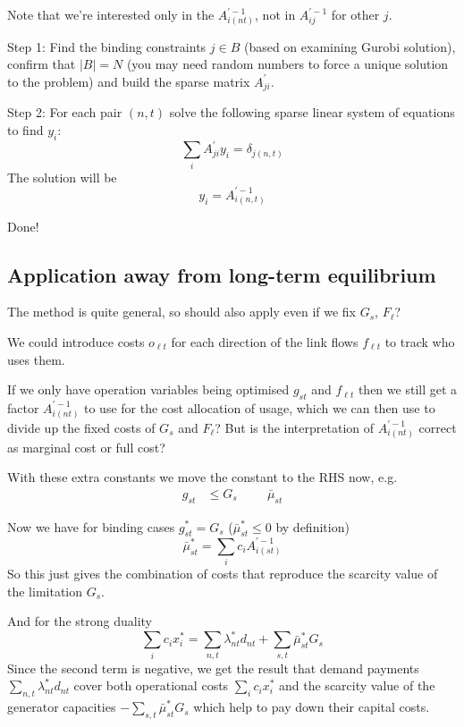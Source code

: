 \documentclass[final,3p,times]{elsarticle}
\begin{document}
Note that we're interested only in the $A^{\prime -1}_{i(nt)}$, not in $A^{\prime -1}_{ij}$ for other $j$.

Step 1: Find the binding constraints $j\in B$ (based on examining Gurobi solution), confirm that $|B| = N$ (you may need random numbers to force a unique solution to the problem) and build the sparse matrix $A^{\prime}_{ji}$.

Step 2: For each pair $(n,t)$ solve the following sparse linear system of equations to find $y_i$:
\begin{equation}
  \sum_i A^{\prime}_{ji} y_i = \delta_{j(n,t)}
\end{equation}
The solution will be
\begin{equation}
  y_i =  A^{\prime -1}_{i(n,t)}
\end{equation}

Done!

\subsection{Application away from long-term equilibrium}

The method is quite general, so should also apply even if we fix $G_s$, $F_\ell$?

We could introduce costs $o_{\ell t}$ for each direction of the link flows $f_{\ell t}$ to track who uses them.

If we only have operation variables being optimised $g_{st}$ and $f_{\ell t}$ then we still get a factor $A^{\prime -1}_{i(nt)}$ to use for the cost allocation of usage, which we can then use to divide up the fixed costs of $G_s$ and $F_\ell$? But is the interpretation of $A^{\prime -1}_{i(nt)}$ correct as marginal cost or full cost?

With these extra constants we move the constant to the RHS now, e.g.
\begin{align}
  g_{st}  & \leq G_s  \hspace{1cm} \bar{\mu}_{st}
\end{align}

Now we have for binding cases $g_{st}^* = G_s$ ($\bar{\mu}_{st}^* \leq 0$ by definition)
\begin{equation}
  \bar{\mu}_{st}^* = \sum_i c_i  A^{\prime -1}_{i(st)}
\end{equation}
So this just gives the combination of costs that reproduce the scarcity value of the limitation $G_s$.

And for the strong duality
\begin{equation}
  \sum_i c_i x_i^* = \sum_{n,t} \lambda^*_{nt} d_{nt} + \sum_{s,t} \bar{\mu}^*_{st} G_{s}
\end{equation}
Since the second term is negative, we get the result that demand payments $ \sum_{n,t} \lambda^*_{nt} d_{nt}$ cover both operational costs $\sum_i c_i x_i^*$ and the scarcity value of the generator capacities $-\sum_{s,t} \bar{\mu}^*_{st} G_{s}$ which help to pay down their capital costs.





\end{document}
